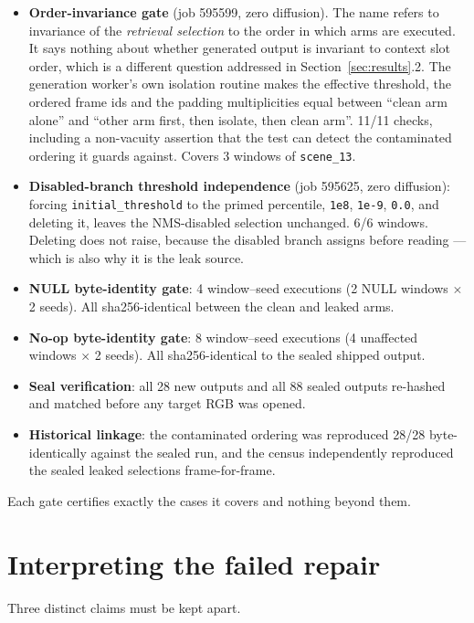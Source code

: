 \documentclass[11pt,a4paper]{article}
\newcommand{\code}[1]{\texttt{\small #1}}
\begin{document}
\begin{itemize}
\item \textbf{Order-invariance gate} (job 595599, zero diffusion). The name refers to invariance of
the \emph{retrieval selection} to the order in which arms are executed. It says nothing about whether
generated output is invariant to context slot order, which is a different question addressed in
Section~\ref{sec:results}.2. The generation worker's own isolation routine makes the effective
threshold, the ordered frame ids and the padding multiplicities equal between ``clean arm alone'' and
``other arm first, then isolate, then clean arm''. 11/11 checks, including a non-vacuity assertion
that the test can detect the contaminated ordering it guards against. Covers 3 windows of
\code{scene\_13}.
\item \textbf{Disabled-branch threshold independence} (job 595625, zero diffusion): forcing
\code{initial\_threshold} to the primed percentile, \code{1e8}, \code{1e-9}, \code{0.0}, and deleting
it, leaves the NMS-disabled selection unchanged. 6/6 windows. Deleting does not raise, because the
disabled branch assigns before reading --- which is also why it is the leak source.
\item \textbf{NULL byte-identity gate}: 4 window--seed executions (2 NULL windows $\times$ 2 seeds).
All sha256-identical between the clean and leaked arms.
\item \textbf{No-op byte-identity gate}: 8 window--seed executions (4 unaffected windows $\times$ 2
seeds). All sha256-identical to the sealed shipped output.
\item \textbf{Seal verification}: all 28 new outputs and all 88 sealed outputs re-hashed and matched
before any target RGB was opened.
\item \textbf{Historical linkage}: the contaminated ordering was reproduced 28/28 byte-identically
against the sealed run, and the census independently reproduced the sealed leaked selections
frame-for-frame.
\end{itemize}

Each gate certifies exactly the cases it covers and nothing beyond them.

\section{Interpreting the failed repair}

Three distinct claims must be kept apart.
\end{document}
